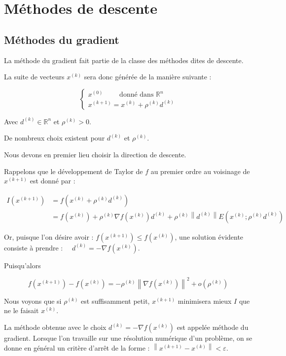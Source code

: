 \documentclass[12pt,a4paper,openay]{book}
\numberwithin{equation}{chapter}
\newcommand{\R}{\mathbb{R}}
\begin{document}
	
	\newpage
	\chapter{M\'ethodes de descente}
	
	\section{M\'ethodes du gradient}
		La m\'ethode du gradient fait partie de la classe des m\'ethodes dites de descente.
		
		La suite de vecteurs $x^{(k)}$ sera donc g\'en\'er\'ee de la mani\`ere suivante :
		
		$$
		\left\{\begin{array}{c}
		x^{(0)}\qquad \text{ donn\'e dans } \R^{n} \\
		x^{(k+1)}=x^{(k)}+\rho^{(k)} d^{(k)}
		\end{array}\right.
		$$
		
		Avec $d^{(k)} \in \R^{n}$ et $\rho^{(k)}>0$.
		
		De nombreux choix existent pour $d^{(k)}$ et $\rho^{(k)}$.
		
		Nous devons en premier lieu choisir la direction de descente.
		
		Rappelons que le d\'eveloppement de Taylor de $f$ au premier ordre au voisinage de $x^{(k+1)}$ est donn\'e par :
		
		$$
		\begin{aligned}
		I\left(x^{(k+1)}\right)&=f\left(x^{(k)}+\rho^{(k)} d^{(k)}\right) \\
		&=f\left(x^{(k)}\right)+\rho^{(k)} \nabla f\left(x^{(k)}\right) d^{(k)}+\rho^{(k)}\left\|d^{(k)}\right\| E\left(x^{(k)} ; \rho^{(k)} d^{(k)}\right)
		\end{aligned}
		$$
		
		
		
		Or, puisque l'on d\'esire avoir : $f\left(x^{(k+1)}\right) \leq f\left(x^{(k)}\right)$, une solution \'evidente consiste \`a prendre : $\quad d^{(k)}=-\nabla f\left(x^{(k)}\right)$.
		
		Puisqu'alors
		
		$$
		f\left(x^{(k+1)}\right)-f\left(x^{(k)}\right)=-\rho^{(k)}\left\|\nabla f\left(x^{(k)}\right)\right\|^{2}+o\left(\rho^{(k)}\right)
		$$
		
		Nous voyons que si $\rho^{(k)}$ est suffisamment petit, $x^{(k+1)}$ minimisera mieux $I$ que ne le faisait $x^{(k)}$.
		
		La m\'ethode obtenue avec le choix $d^{(k)}=-\nabla f\left(x^{(k)}\right)$ est appel\'ee m\'ethode du gradient. Lorsque l'on travaille sur une r\'esolution num\'erique d'un probl\`eme, on se donne en g\'en\'eral un crit\`ere d'arr\^et de la forme : $\left\|x^{(k+1)}-x^{(k)}\right\|<\varepsilon$.
		
\end{document}
